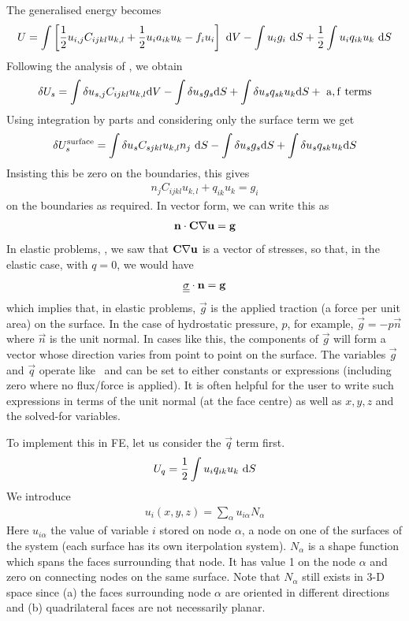 \documentclass[a4paper]{article}
\begin{document}
The generalised energy becomes
\begin{eqnarray}
  U=\int\left[\frac12 u_{i,j}C_{ijkl}u_{k,l}+\frac12 u_i a_{ik} u_k-f_i u_i\right]
~\mathrm{d} V-\int u_i g_i~\mathrm{d} S
+\frac 12 \int u_i q_{ik} u_k~\mathrm{d} S
\end{eqnarray}
Following the analysis of , we obtain
\begin{eqnarray}
  \delta U_s=\int \delta u_{s,j}C_{ijkl}u_{k,l}\mathrm{d} V-\int \delta u_s g_s\mathrm{d} S
+\int \delta u_s q_{sk}u_k\mathrm{d} S+~\mathrm{a,f~terms}
\end{eqnarray}
Using integration by parts and considering only the surface term we get
\begin{eqnarray}
  \delta U_s^{\mathrm{surface}}=\int \delta u_s C_{sjkl}u_{k,l}n_j~\mathrm{d} S
-\int \delta u_s g_s \mathrm{d} S
+\int \delta u_s q_{sk}u_k\mathrm{d} S
\end{eqnarray}
Insisting this be zero on the boundaries, this gives
\begin{eqnarray}
  n_jC_{ijkl}u_{k,l}+q_{ik}u_k=g_i
\end{eqnarray}
on the boundaries as required. In vector form, we can write this as
\begin{eqnarray}
  \mathbf{n}\cdot \mathbf{C}\nabla\mathbf{u}=\mathbf{g}
\end{eqnarray}
In elastic problems, , we saw that $\mathbf{C}\nabla\mathbf{u}$ is
a vector of stresses, so that, in the elastic case, with $q=0$, we
would have
\begin{eqnarray}
  \underline{\underline{\sigma}}\cdot\mathbf{n}=\mathbf{g}
\end{eqnarray}
which implies that, in elastic problems, $\vec g$ is the applied
traction (a force per unit area) on the surface. In the case of
hydrostatic pressure, $p$, for example, $\vec g=-p\vec n$ where $\vec
n$ is the unit normal. In cases like this, the components of $\vec g$
will form a vector whose direction varies from point to point on the
surface. The variables $\vec g$ and $\vec q$ operate like \caf\ and
can be set to either constants or expressions (including zero where no
flux/force is applied). It is often helpful for the user to write such
expressions in terms of the unit normal (at the face centre) as well
as $x,y,z$ and the solved-for variables.

To implement this in FE, let us consider the $\vec q$ term first.
\begin{eqnarray}
  U_q=\frac 12 \int u_i q_{ik} u_k~\mathrm{d} S
\end{eqnarray}
We introduce
\begin{eqnarray}
  u_i(x,y,z)=\sum_\alpha u_{i\alpha} N_\alpha
\end{eqnarray}
Here $u_{i\alpha}$ the value of variable $i$ stored on node $\alpha$,
a node on one of the surfaces of the system (each surface has its own
iterpolation system). $N_\alpha$ is a shape function which spans the
faces surrounding that node. It has value 1 on the node $\alpha$ and
zero on connecting nodes on the same surface. Note that $N_\alpha$
still exists in 3-D space since (a) the faces surrounding node
$\alpha$ are oriented in different directions and (b) quadrilateral
faces are not necessarily planar.
\end{document}
